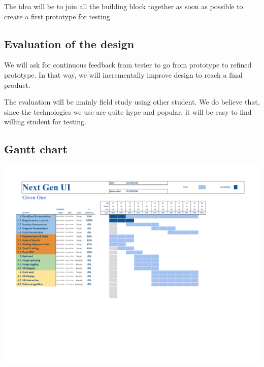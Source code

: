 \documentclass[11pt,a4paper]{article}
\begin{document}
The idea will be to join all the building block together as soon as possible to create a first prototype for testing.

\subsection{Evaluation of the design}

We will ask for continuous feedback from tester to go from prototype to refined prototype. In that way, we will incrementally improve design to reach a final product.

The evaluation will be mainly field study using other student. We do believe that, since the technologies we use are quite hype and popular, it will be easy to find willing student for testing.

\begin{landscape}
\section{Gantt chart}
\includegraphics[scale=0.8,angle=0]{static/Gantt-chart.pdf}
\end{landscape}


\end{document}
